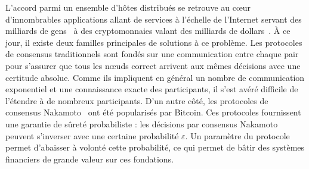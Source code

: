 \documentclass[letterpaper,twocolumn,10pt]{article}
\theoremstyle{definition}
\begin{document}
L'accord parmi un ensemble d'hôtes distribués se retrouve au cœur d'innombrables applications allant de services à l'échelle de l'Internet servant des milliards de gens~\cite{Burrows06,HuntKJR10} à des cryptomonnaies valant des milliards de dollars~\cite{marketcapcryptocurrency}.
À ce jour, il existe deux familles principales de solutions à ce problème.
Les protocoles de consensus traditionnels
sont fondés sur une communication entre chaque pair pour s'assurer que tous les nœuds correct arrivent aux mêmes décisions avec une certitude absolue.
Comme ils impliquent en général un nombre de communication exponentiel et une connaissance exacte des participants, il s'est avéré difficile de l'étendre
à de nombreux participants.
D'un autre côté, les protocoles de consensus Nakamoto~\cite{nakamoto2008bitcoin,GarayKL15, PassSS17, SompolinskyZ15, SompolinskyLZ16, SompolinskyZ18, BentovHMN17, EyalGSR16,Kokoris-KogiasJ16,PassS16a, PassS18} ont été popularisés par Bitcoin.
Ces protocoles fournissent une garantie de sûreté probabiliste : les décisions par consensus Nakamoto peuvent s'inverser avec une certaine probabilité $\varepsilon$.
Un paramètre du protocole permet d'abaisser à volonté cette probabilité, ce qui permet de bâtir des systèmes financiers de grande valeur sur ces fondations.
\end{document}
